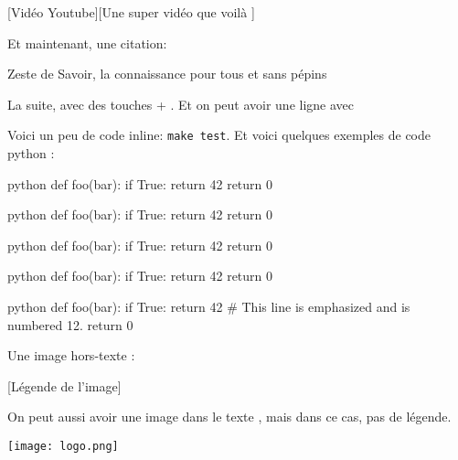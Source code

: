 \documentclass[small]{zmdocument}
\begin{document}
[Vidéo Youtube][Une super vidéo que voilà ]


Et maintenant, une citation:

\begin{Quotation}[Clem]
Zeste de Savoir, la connaissance pour tous et sans pépins
\end{Quotation}

La suite, avec des touches  + . Et on peut avoir une ligne avec

\horizontalLine

Voici un peu de code inline: \verb`make test`. Et voici quelques exemples de code python :

\begin{codeBlock}{python}
def foo(bar):
    if True:
        return 42
    return 0
\end{codeBlock}

\begin{codeBlock}{python}
def foo(bar):
    if True:
        return 42
    return 0
\end{codeBlock}

\begin{codeBlock}{python}
def foo(bar):
    if True:
        return 42
    return 0
\end{codeBlock}

\begin{codeBlock}[][1, 3-4]{python}
def foo(bar):
    if True:
        return 42
    return 0
\end{codeBlock}

\begin{codeBlock}[][12][10]{python}
def foo(bar):
    if True:
        return 42 # This line is emphasized and is numbered 12.
    return 0
\end{codeBlock}

Une image hors-texte :

[Légende de l’image]

On peut aussi avoir une image dans le texte , mais dans ce cas, pas de légende.

\begin{center}
\texttt{[image: logo.png]}
\end{center}
\end{document}
